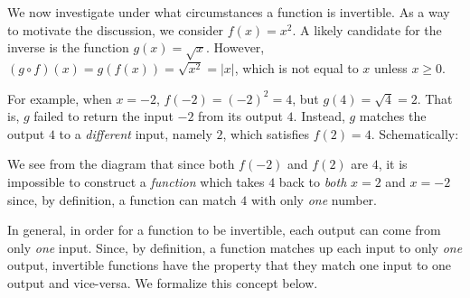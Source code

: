 \documentclass{ximera}
\begin{document}
We now investigate under what circumstances a function is invertible. As a way to motivate the discussion, we consider  $f(x) = x^2$.  A likely candidate for the inverse is the function $g(x) = \sqrt{x}$.  However,  $(g\circ f)(x) = g(f(x)) = \sqrt{x^2} = |x|$, which is not equal to $x$ unless $x \geq 0$.  

\smallskip

For example, when $x=-2$,  $f(-2)= (-2)^2 = 4$, but $g(4) = \sqrt{4}=2$.  That is, $g$ failed to return the input $-2$ from its output $4$.  Instead, $g$ matches the output $4$ to a \textit{different} input, namely $2$, which satisfies $f(2) = 4$.  Schematically:

\begin{center}


% 


\end{center}

We see from the diagram that since both $f(-2)$ and $f(2)$ are $4$, it is impossible to construct a \textit{function} which takes $4$ back to \textit{both} $x=2$ and $x=-2$ since, by definition, a function can match $4$ with only \textit{one} number.

\smallskip


In general, in order for a function to be invertible, each output can come from only \textit{one} input.  Since, by definition, a function matches up each input to only \textit{one} output, invertible functions have the property that they match one input to one output and vice-versa.  We formalize this concept below.
\end{document}
